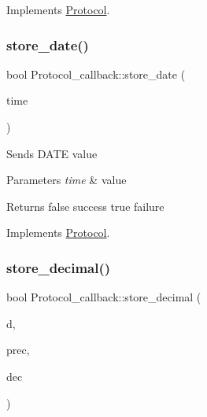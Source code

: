 Implements \mbox{\hyperlink{classProtocol}{Protocol}}.

\mbox{\label{classProtocol__callback_a7cb123a81dfebaeccc0f38883a4ad539}} 
\subsubsection{\texorpdfstring{store\+\_\+date()}{store\_date()}}
{\footnotesize\ttfamily bool Protocol\+\_\+callback\+::store\+\_\+date (\begin{DoxyParamCaption}\item[{M\+Y\+S\+Q\+L\+\_\+\+T\+I\+ME $\ast$}]{time }\end{DoxyParamCaption})\hspace{0.3cm}{\ttfamily [virtual]}}

Sends D\+A\+TE value


\begin{DoxyParams}{Parameters}
{\em time} & value\\
\hline
\end{DoxyParams}
\begin{DoxyReturn}{Returns}
false success true failure 
\end{DoxyReturn}


Implements \mbox{\hyperlink{classProtocol}{Protocol}}.

\mbox{\label{classProtocol__callback_a67178d939a62516c96c21e56fb6f7b0e}} 
\subsubsection{\texorpdfstring{store\+\_\+decimal()}{store\_decimal()}}
{\footnotesize\ttfamily bool Protocol\+\_\+callback\+::store\+\_\+decimal (\begin{DoxyParamCaption}\item[{const \mbox{\hyperlink{classmy__decimal}{my\+\_\+decimal}} $\ast$}]{d,  }\item[{uint}]{prec,  }\item[{uint}]{dec }\end{DoxyParamCaption})\hspace{0.3cm}{\ttfamily [virtual]}}

